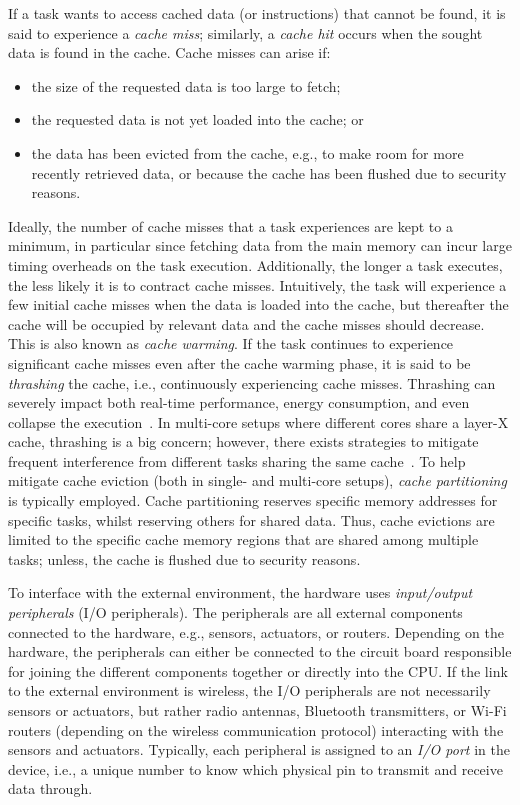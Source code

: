 If a task wants to access cached data (or instructions) that cannot be found, it is said to experience a \emph{cache miss}; similarly, a \emph{cache hit} occurs when the sought data is found in the cache.
Cache misses can arise if:
%
\begin{itemize}
    \item the size of the requested data is too large to fetch;
    \item the requested data is not yet loaded into the cache; or
    \item the data has been evicted from the cache, e.g., to make room for more recently retrieved data, or because the cache has been flushed due to security reasons.
\end{itemize}
%
Ideally, the number of cache misses that a task experiences are kept to a minimum, in particular since fetching data from the main memory can incur large timing overheads on the task execution.
Additionally, the longer a task executes, the less likely it is to contract cache misses.
Intuitively, the task will experience a few initial cache misses when the data is loaded into the cache, but thereafter the cache will be occupied by relevant data and the cache misses should decrease.
This is also known as \emph{cache warming}.
If the task continues to experience significant cache misses even after the cache warming phase, it is said to be \emph{thrashing} the cache, i.e., continuously experiencing cache misses.
Thrashing can severely impact both real-time performance, energy consumption, and even collapse the execution~\cite{Wadleigh:2000}.
In multi-core setups where different cores share a layer-X cache, thrashing is a big concern; however, there exists strategies to mitigate frequent interference from different tasks sharing the same cache~\cite{Brandenburg:2011}.
To help mitigate cache eviction (both in single- and multi-core setups), \emph{cache partitioning} is typically employed.
Cache partitioning reserves specific memory addresses for specific tasks, whilst reserving others for shared data.
Thus, cache evictions are limited to the specific cache memory regions that are shared among multiple tasks; unless, the cache is flushed due to security reasons.

To interface with the external environment, the hardware uses \emph{input/output peripherals} (I/O peripherals).
The peripherals are all external components connected to the hardware, e.g., sensors, actuators, or routers.
Depending on the hardware, the peripherals can either be connected to the circuit board responsible for joining the different components together or directly into the CPU.
If the link to the external environment is wireless, the I/O peripherals are not necessarily sensors or actuators, but rather radio antennas, Bluetooth transmitters, or Wi-Fi routers (depending on the wireless communication protocol) interacting with the sensors and actuators.
Typically, each peripheral is assigned to an \emph{I/O port} in the device, i.e., a unique number to know which physical pin to transmit and receive data through. 

